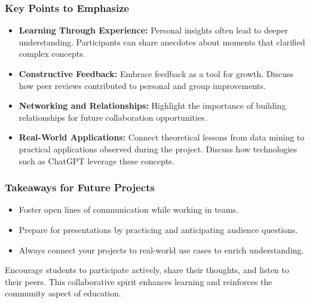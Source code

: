 \documentclass[aspectratio=169]{beamer}
\begin{document}
\begin{frame}[fragile]
    \frametitle{Key Points to Emphasize}
    \begin{itemize}
        \item \textbf{Learning Through Experience:} 
            Personal insights often lead to deeper understanding. Participants can share anecdotes about moments that clarified complex concepts.
        \item \textbf{Constructive Feedback:} 
            Embrace feedback as a tool for growth. Discuss how peer reviews contributed to personal and group improvements.
        \item \textbf{Networking and Relationships:} 
            Highlight the importance of building relationships for future collaboration opportunities.
        \item \textbf{Real-World Applications:} 
            Connect theoretical lessons from data mining to practical applications observed during the project. Discuss how technologies such as ChatGPT leverage these concepts.
    \end{itemize}
\end{frame}

\begin{frame}[fragile]
    \frametitle{Takeaways for Future Projects}
    \begin{itemize}
        \item Foster open lines of communication while working in teams.
        \item Prepare for presentations by practicing and anticipating audience questions.
        \item Always connect your projects to real-world use cases to enrich understanding.
    \end{itemize}
    
    Encourage students to participate actively, share their thoughts, and listen to their peers. This collaborative spirit enhances learning and reinforces the community aspect of education.
\end{frame}
\end{document}
